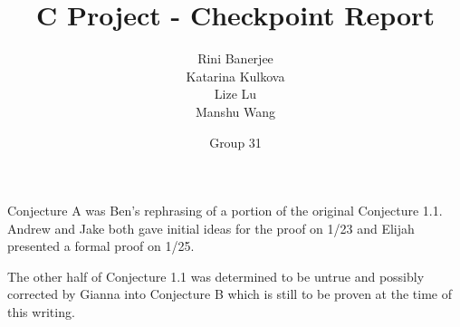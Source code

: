\usepackage{wasysym} %

\title{C Project - Checkpoint Report}

\author{Rini Banerjee\\Katarina Kulkova\\Lize Lu\\Manshu Wang}

\date{Group 31}



\maketitle



Conjecture A was Ben's rephrasing of a portion of the original Conjecture 1.1.  Andrew and Jake both gave initial ideas for the proof on 1/23 and Elijah presented a formal proof on 1/25.

The other half of Conjecture 1.1 was determined to be untrue and possibly corrected by Gianna into Conjecture B which is still to be proven at the time of this writing.

\setcounter{section}{1}
\setcounter{theorem}{1}


